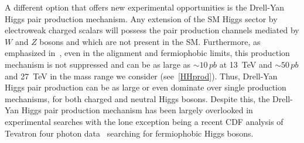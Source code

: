 \documentclass[../report.tex]{subfiles}
\begin{document}
\label{sec:pair}

A different option that offers new experimental opportunities is
  the Drell-Yan Higgs pair production mechanism. Any extension of the SM Higgs sector by electroweak charged scalars will possess the pair production channels mediated by $W$ and $Z$ bosons and which are not present in the SM. Furthermore, as emphasized in~\cite{Akeroyd:2003bt,Akeroyd:2003xi,Akeroyd:2003jp,Ilisie:2014hea,Delgado:2016arn,Vega:2018ddp}, even in the alignment and fermiophobic limits, this production mechanism is not suppressed and can be as large as $\sim 10\,pb$ at 13~TeV and $\sim 50\,pb$ and 27~TeV in the mass range we consider (see~\ref{HHprod}). Thus, Drell-Yan Higgs pair production can be as large or even dominate over single  production mechanisms, for both charged and neutral Higgs bosons. Despite this, the Drell-Yan Higgs pair production mechanism has been largely overlooked in experimental searches with the lone exception being a recent CDF analysis of Tevatron four photon data~\cite{Aaltonen:2016fnw} searching for fermiophobic Higgs bosons.  
\end{document}
